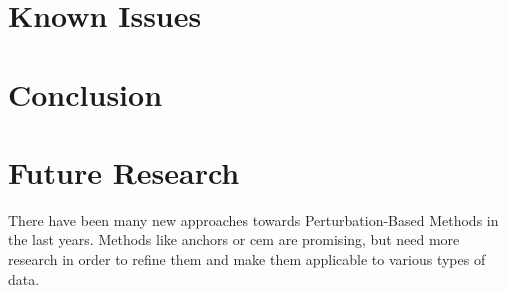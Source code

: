 \section{Known Issues}

\section{Conclusion}

\section{Future Research}
There have been many new approaches towards Perturbation-Based Methods in the last years. Methods like anchors or \gls{cem} are promising, but need more research in order to refine them and make them applicable to various types of data. 
